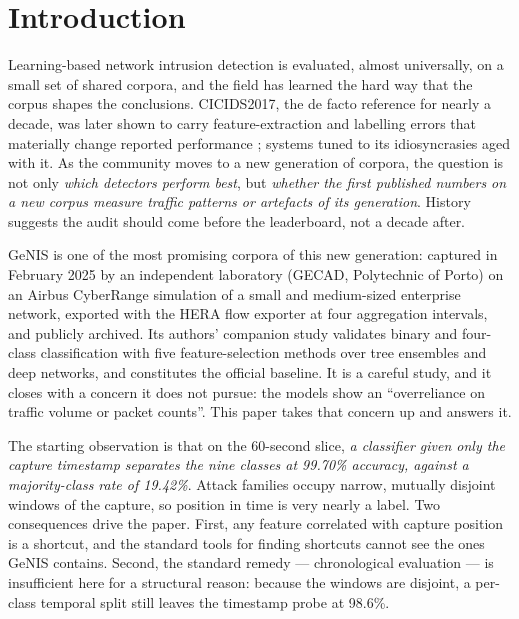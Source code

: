 \documentclass[review,12pt]{elsarticle}
\begin{document}
\section{Introduction}
\label{sec:intro}

Learning-based network intrusion detection is evaluated, almost universally, on a small
set of shared corpora, and the field has learned the hard way that the corpus shapes the
conclusions. CICIDS2017, the de facto reference for nearly a decade, was later shown to
carry feature-extraction and labelling errors that materially change reported performance
\cite{engelen2021troubleshooting,liu2022error,lanvin2022errors}; systems tuned to its
idiosyncrasies aged with it. As the community moves to a new generation of corpora, the
question is not only \emph{which detectors perform best}, but \emph{whether the first
published numbers on a new corpus measure traffic patterns or artefacts of its
generation}. History suggests the audit should come before the leaderboard, not a decade
after.

GeNIS \cite{silva2025genis} is one of the most promising corpora of this new generation:
captured in February 2025 by an independent laboratory (GECAD, Polytechnic of Porto) on
an Airbus CyberRange simulation of a small and medium-sized enterprise network, exported
with the HERA flow exporter \cite{pinto2024hera} at four aggregation intervals, and
publicly archived. Its authors' companion study \cite{silva2025binary} validates binary
and four-class classification with five feature-selection methods over tree ensembles and
deep networks, and constitutes the official baseline. It is a careful study, and it
closes with a concern it does not pursue: the models show an ``overreliance on traffic
volume or packet counts''. This paper takes that concern up and answers it.

The starting observation is that on the 60-second slice, \emph{a classifier given only
the capture timestamp separates the nine classes at 99.70\% accuracy, against a
majority-class rate of 19.42\%}. Attack families occupy narrow, mutually disjoint windows
of the capture, so position in time is very nearly a label. Two consequences drive the
paper. First, any feature correlated with capture position is a shortcut, and the
standard tools for finding shortcuts cannot see the ones GeNIS contains. Second, the
standard remedy --- chronological evaluation --- is insufficient here for a structural
reason: because the windows are disjoint, a per-class temporal split still leaves the
timestamp probe at 98.6\%.
\end{document}
